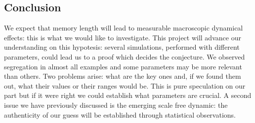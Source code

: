 \subsection{Conclusion}\label{subsec:conclusion}
%
%
%
%
 We expect that memory length will lead to measurable macroscopic
 dynamical effects: this is what we would like to investigate.
 This project will advance our understanding on this hypotesis:
 several simulations, performed with different parameters, could lead
 us to a proof which decides the conjecture.
 We observed segregation in almost all examples and some parameters may be
 more relevant than others. Two problems arise: what are the key ones
 and, if we found them out, what their values or their ranges would be.
 This is pure speculation on our part but if it were right we could
 establish what parameters are crucial.
 A second issue we have previously discussed is the emerging scale
 free dynamic: the authenticity of our guess will be established
 through statistical observations.
 
